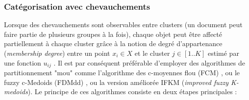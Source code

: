 
\subsubsection{Catégorisation avec chevauchements}

Lorsque des chevauchements sont observables entre clusters (un document peut faire partie de plusieurs groupes à la fois), chaque objet peut être affecté partiellement à chaque cluster grâce à la notion de degré d'appartenance (\textit{membership degree}) entre un point $x_i \in X$ et le cluster $j \in [1..K]$ estimé par une fonction $u_{ij}$  \citep{baraldi1999surveyfuzzyclstering}. Il est par conséquent préférable d'employer des algorithmes de partitionnement "mou" comme l'algorithme des c-moyennes flou (FCM) \citep{bezdek1984fcm, hathaway1989fuzzycmeans}, ou le fuzzy c-Medoids (FDMdd) \citep{krishnapuram2001fuzzycmedoids}, ou la version améliorée IFKM (\textit{improved fuzzy K-medoids})\citep{sabzi2011fuzzykmedoids}.  Le principe de ces algorithmes consiste en deux étapes principales \citep{sabzi2011fuzzykmedoids}: 

